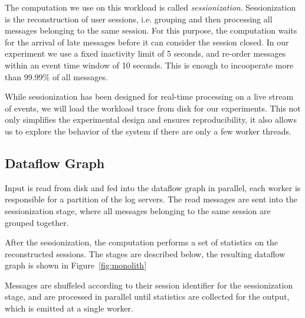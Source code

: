 The computation we use on this workload is called \emph{sessionization}. Sessionization
is the reconstruction of user sessions, i.e. grouping and then processing all
messages belonging to the same session. For this purpose, the computation waits for
the arrival of late messages before it can consider the session closed. In
our experiment we use a fixed inactivity limit of 5 seconds, and re-order messages
within an event time window of 10 seconds. This is enough to incooperate more
than 99.99\% of all messages. 

While sessionization has been designed for real-time processing on a live
stream of events, we will load the workload trace from disk for our experiments.
This not only simplifies the experimental design and ensures reproducibility,
it also allows us to explore the behavior of the system if there are only a
few worker threads.

\subsection{Dataflow Graph}

Input is read from disk and fed into the dataflow graph in parallel, each worker
is responsible for a partition of the log servers. The read messages are sent
into the sessionization stage, where all messages belonging to the same session
are grouped together.

After the sessionization, the computation performs a set of statistics on the
reconstructed sessions. The stages are described below, the resulting dataflow
graph is shown in Figure~\ref{fig:monolith}

Messages are shuffeled according to their session identifier for the
sessionization stage, and are processed in parallel until statistics are
collected for the output, which is emitted at a single worker. 

